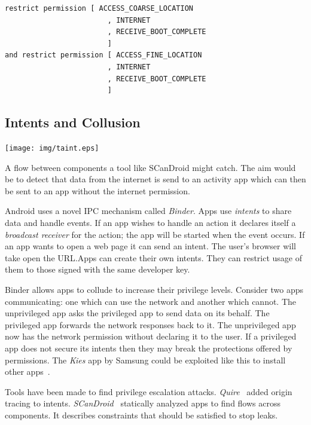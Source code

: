 \documentclass[a4paper]{article}
\begin{document}
\begin{lstlisting}[language=Kirin]
    restrict permission [ ACCESS_COARSE_LOCATION
                        , INTERNET
                        , RECEIVE_BOOT_COMPLETE
                        ]
and restrict permission [ ACCESS_FINE_LOCATION
                        , INTERNET
                        , RECEIVE_BOOT_COMPLETE
                        ]
\end{lstlisting}

\subsection{Intents and Collusion}\label{sec:intents}

\begin{marginfigure}
  \centering
  \texttt{[image: img/taint.eps]}
  \caption{A flow between components a tool like SCanDroid might
  catch. The aim would be to detect that data from the internet is send to an
activity app which can then be sent to an app without the internet permission.}
  \label{fig:taint}
\end{marginfigure}

Android uses a novel IPC mechanism called \emph{Binder}. Apps use \emph{intents}
to share data and handle events. If an app wishes to handle an
 action it declares itself a \emph{broadcast receiver} for
the action; the app will be started when the event occurs.  If an app wants to
open a web page it can send an  intent. The user's browser
will take open the URL.\@ Apps can create their own intents. They can restrict
usage of them to those signed with the same developer key.

Binder allows apps to collude to increase their privilege levels.  Consider two
apps communicating: one which can use the network and another which cannot.  The
unprivileged app asks the privileged app to send data on its behalf. The
privileged app forwards the network responses back to it. The unprivileged app
now has the network permission without declaring it to the user.  If a
privileged app does not secure its intents then they may break the protections
offered by permissions. The \emph{Kies} app by Samsung could be exploited like
this to install other apps~\cite{moulu:8btkPowj}.

Tools have been made to find privilege escalation attacks.
\emph{Quire}~\cite{Bugiel:2012ui} added origin tracing to intents.
\emph{SCanDroid}~\cite{Fuchs:2009vi} statically analyzed apps to find flows
across components. It describes constraints that should be satisfied to stop
leaks. 
\end{document}
